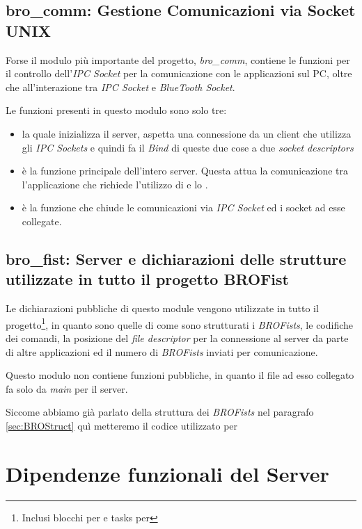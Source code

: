 \subsection[bro\_comm]{bro\_comm: Gestione Comunicazioni via Socket UNIX}
Forse il modulo più importante del progetto, \emph{bro\_comm}, contiene le
funzioni per il controllo dell'\emph{IPC Socket} per la comunicazione con
le applicazioni sul PC, oltre che all'interazione tra \emph{IPC Socket} e
\emph{BlueTooth Socket}.

Le funzioni presenti in questo modulo sono solo tre:
\begin{itemize}
    \item {} la quale
        inizializza il server, aspetta una connessione da un client che
        utilizza gli \emph{IPC Sockets} e quindi fa il \emph{Bind} di
        queste due cose a due \emph{socket descriptors}
    \item {} è la funzione principale dell'intero server. Questa
        attua la comunicazione tra l'applicazione che richiede l'utilizzo
        di \BROFist{} e lo \SPAM{}.
    \item {} è la funzione che chiude
        le comunicazioni via \emph{IPC Socket} ed i socket ad esse
        collegate.
\end{itemize}

\subsection[bro\_fist]{bro\_fist: Server e dichiarazioni delle strutture
utilizzate in tutto il progetto BROFist}
Le dichiarazioni pubbliche di questo module vengono utilizzate in tutto il
progetto\footnote{Inclusi blocchi per  e tasks per
\nxt{}}, in quanto sono quelle di come sono strutturati i \emph{BROFists},
le codifiche dei comandi, la posizione del \emph{file descriptor} per la
connessione al server da parte di altre applicazioni ed il numero di
\emph{BROFists} inviati per comunicazione.

Questo modulo non contiene funzioni pubbliche, in quanto il file
 ad esso collegato fa solo da \emph{main} per il server.

Siccome abbiamo già parlato della struttura dei \emph{BROFists} nel paragrafo
\ref{sec:BROStruct} quì metteremo il codice utilizzato per 

\section{Dipendenze funzionali del Server}


\cleardoublepage
